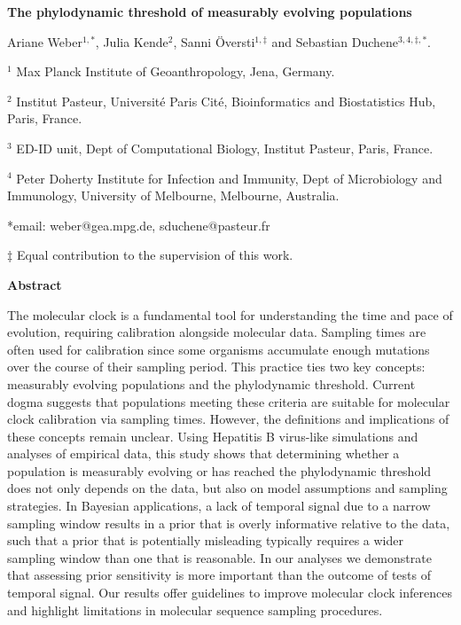 \documentclass[11pt]{article}
\begin{document}
\begin{flushright}

\end{flushright}
\begin{center}
	\begin{LARGE}
	\textbf{The phylodynamic threshold of measurably evolving populations}
	\end{LARGE}

Ariane Weber$^{1,*}$, Julia Kende$^{2}$, Sanni Översti$^{1, \ddagger}$ and Sebastian Duchene$^{3,4,\ddagger, *}$.
\end{center}

$^{1}$ Max Planck Institute of Geoanthropology, Jena, Germany.

$^{2}$ Institut Pasteur, Université Paris Cité, Bioinformatics and Biostatistics Hub, Paris, France.

$^{3}$ ED-ID unit, Dept of Computational Biology, Institut Pasteur, Paris, France.

$^{4}$ Peter Doherty Institute for Infection and Immunity, Dept of Microbiology and Immunology, University of Melbourne, Melbourne, Australia.


*email: weber@gea.mpg.de, sduchene@pasteur.fr

$\ddagger$ Equal contribution to the supervision of this work.
\newline

\begin{Large}
	\textbf{Abstract}
\end{Large}
The molecular clock is a fundamental tool for understanding the time and pace of evolution, requiring calibration alongside molecular data. Sampling times are often used for calibration since some organisms accumulate enough mutations over the course of their sampling period. This practice ties two key concepts: measurably evolving populations and the phylodynamic threshold. Current dogma suggests that populations meeting these criteria are suitable for molecular clock calibration via sampling times. However, the definitions and implications of these concepts remain unclear. Using Hepatitis B virus-like simulations and analyses of empirical data, this study shows that determining whether a population is measurably evolving or has reached the phylodynamic threshold does not only depends on the data, but also on model assumptions and sampling strategies. In Bayesian applications, a lack of temporal signal due to a narrow sampling window results in a prior that is overly informative relative to the data, such that a prior that is potentially misleading typically requires a wider sampling window than one that is reasonable. In our analyses we demonstrate that assessing prior sensitivity is more important than the outcome of tests of temporal signal. Our results offer guidelines to improve molecular clock inferences and highlight limitations in molecular sequence sampling procedures.
\end{document}
